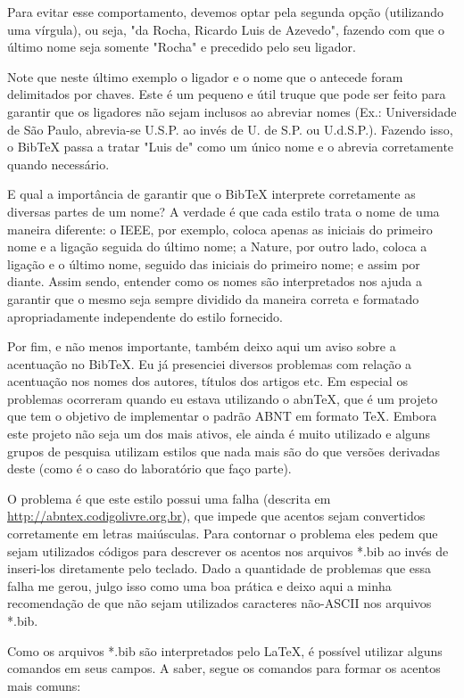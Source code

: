 \begin{anexosenv}
Para evitar esse comportamento, devemos optar pela segunda opção (utilizando uma vírgula), ou seja, "da Rocha, Ricardo {Luis de} Azevedo"{}, fazendo com que o último nome seja somente "Rocha"{} e precedido pelo seu ligador.

Note que neste último exemplo o ligador e o nome que o antecede foram delimitados por chaves. Este é um pequeno e útil truque que pode ser feito para garantir que os ligadores não sejam inclusos ao abreviar nomes (Ex.: Universidade de São Paulo, abrevia-se U.S.P. ao invés de U. de S.P. ou U.d.S.P.). Fazendo isso, o BibTeX passa a tratar "Luis de"{} como um único nome e o abrevia corretamente quando necessário.

E qual a importância de garantir que o BibTeX interprete corretamente as diversas partes de um nome? A verdade é que cada estilo trata o nome de uma maneira diferente: o IEEE, por exemplo, coloca apenas as iniciais do primeiro nome e a ligação seguida do último nome; a Nature, por outro lado, coloca a ligação e o último nome, seguido das iniciais do primeiro nome; e assim por diante. Assim sendo, entender como os nomes são interpretados nos ajuda a garantir que o mesmo seja sempre dividido da maneira correta e formatado apropriadamente independente do estilo fornecido.

Por fim, e não menos importante, também deixo aqui um aviso sobre a acentuação no BibTeX. Eu já presenciei diversos problemas com relação a acentuação nos nomes dos autores, títulos dos artigos etc. Em especial os problemas ocorreram quando eu estava utilizando o abnTeX, que é um projeto que tem o objetivo de implementar o padrão ABNT em formato TeX. Embora este projeto não seja um dos mais ativos, ele ainda é muito utilizado e alguns grupos de pesquisa utilizam estilos que nada mais são do que versões derivadas deste (como é o caso do laboratório que faço parte).

O problema é que este estilo possui uma falha (descrita em \href{http://abntex.codigolivre.org.br/node5.html}{http://abntex.codigolivre.org.br}), que impede que acentos sejam convertidos corretamente em letras maiúsculas. Para contornar o problema eles pedem que sejam utilizados códigos para descrever os acentos nos arquivos *.bib ao invés de inseri-los diretamente pelo teclado. Dado a quantidade de problemas que essa falha me gerou, julgo isso como uma boa prática e deixo aqui a minha recomendação de que não sejam utilizados caracteres não-ASCII nos arquivos *.bib.

Como os arquivos *.bib são interpretados pelo LaTeX, é possível utilizar alguns comandos em seus campos. A saber, segue os comandos para formar os acentos mais comuns:
\\
\\
\\


\end{anexosenv}
